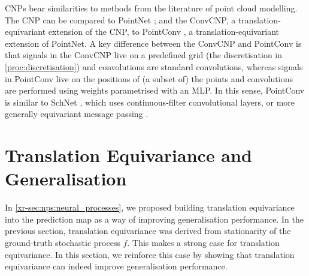 \documentclass[12pt]{report}
\newcommand{\xrprefix}[1]{xr-#1}
\begin{document}
CNPs bear similarities to methods from the literature of point cloud modelling.
The CNP can be compared to PointNet \parencite{Qi:2017:PointNet_Deep_Learning_on_Point};
and the ConvCNP, a translation-equivariant extension of the CNP,
to PointConv \parencite{Wu:2019:PointConv_Deep_Convolutional_Networks_on}, 
a translation-equivariant extension of PointNet.
A key difference between the ConvCNP and PointConv is that signals in the ConvCNP live on a predefined grid (the discretisation in \cref{proc:discretisation}) and convolutions are standard convolutions, whereas signals in PointConv live on the positions of (a subset of) the points and convolutions are performed using weights parametrised with an MLP.
In this sense, PointConv is similar to SchNet
\parencite{Schutt:2017:SchNet_A_Continuous-Filter_Convolutional_Neural}, which uses continuous-filter convolutional layers, or more generally
equivariant message passing \parencite{Satorras:2021:En_Equivariant_Graph_Neural_Networks}. 


\section{Translation Equivariance and Generalisation}
\label{sec:convcnps:generalisation}

In \cref{\xrprefix{sec:nps:neural_processes}}, we proposed building translation equivariance into the prediction map as a way of improving generalisation performance.
In the previous section, translation equivariance was derived from stationarity of the ground-truth stochastic process $f$.
This makes a strong case for translation equivariance.
In this section, we reinforce this case by showing that translation equivariance can indeed improve generalisation performance.
\end{document}
